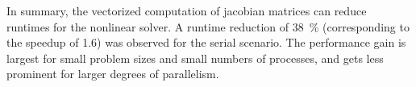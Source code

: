 In summary, the vectorized computation of jacobian matrices can reduce runtimes for the nonlinear solver. A runtime reduction of \SI{38}{\percent} (corresponding to the speedup of \num{1.6}) was observed for the serial scenario. The performance gain is largest for small problem sizes and small numbers of processes, and gets less prominent for larger degrees of parallelism.

